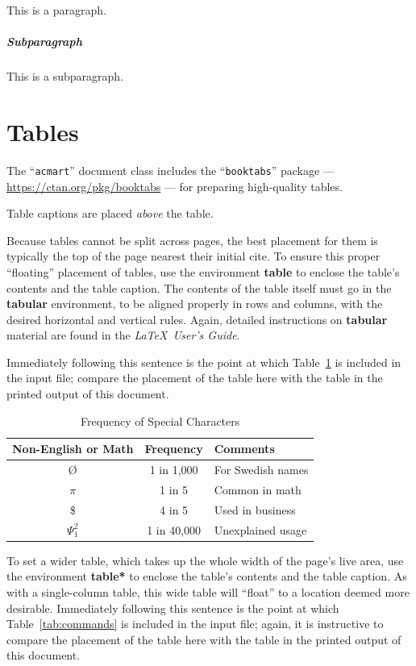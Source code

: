 This is a paragraph.

\subparagraph{Subparagraph}

This is a subparagraph.

\section{Tables}

The ``\verb|acmart|'' document class includes the ``\verb|booktabs|''
package --- \url{https://ctan.org/pkg/booktabs} --- for preparing
high-quality tables.

Table captions are placed {\itshape above} the table.

Because tables cannot be split across pages, the best placement for
them is typically the top of the page nearest their initial cite.  To
ensure this proper ``floating'' placement of tables, use the
environment \textbf{table} to enclose the table's contents and the
table caption.  The contents of the table itself must go in the
\textbf{tabular} environment, to be aligned properly in rows and
columns, with the desired horizontal and vertical rules.  Again,
detailed instructions on \textbf{tabular} material are found in the
\textit{\LaTeX\ User's Guide}.

Immediately following this sentence is the point at which
Table~\ref{tab:freq} is included in the input file; compare the
placement of the table here with the table in the printed output of
this document.

\begin{table}
  \caption{Frequency of Special Characters}
  \label{tab:freq}
  \begin{tabular}{ccl}
    \toprule
    Non-English or Math&Frequency&Comments\\
    \midrule
    \O & 1 in 1,000& For Swedish names\\
    $\pi$ & 1 in 5& Common in math\\
    \$ & 4 in 5 & Used in business\\
    $\Psi^2_1$ & 1 in 40,000& Unexplained usage\\
  \bottomrule
\end{tabular}
\end{table}

To set a wider table, which takes up the whole width of the page's
live area, use the environment \textbf{table*} to enclose the table's
contents and the table caption.  As with a single-column table, this
wide table will ``float'' to a location deemed more
desirable. Immediately following this sentence is the point at which
Table~\ref{tab:commands} is included in the input file; again, it is
instructive to compare the placement of the table here with the table
in the printed output of this document.

